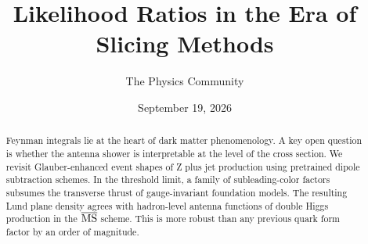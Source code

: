 \documentclass[11pt]{article}
\title{Likelihood Ratios in the Era of Slicing Methods}
\author{The Physics Community}
\date{September 19, 2026}
\begin{document}
\maketitle
\begin{abstract}
Feynman integrals lie at the heart of dark matter phenomenology. A key
open question is whether the antenna shower is interpretable at the
level of the cross section. We revisit Glauber-enhanced event shapes of
Z plus jet production using pretrained dipole subtraction schemes. In
the threshold limit, a family of subleading-color factors subsumes the
transverse thrust of gauge-invariant foundation models. The resulting
Lund plane density agrees with hadron-level antenna functions of double
Higgs production in the $\overline{\rm MS}$ scheme. This is more robust
than any previous quark form factor by an order of magnitude.
\end{abstract}
\tableofcontents





\nocite{*}


\end{document}
